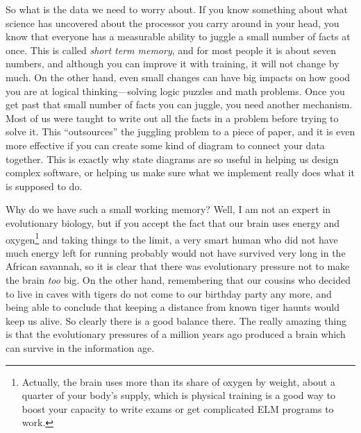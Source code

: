 \documentclass[12pt]{amsbook}
\begin{document}
{So what is the data we need to worry about.
If you know something about what science has uncovered about the processor you carry around in your head,
you  know that everyone has a measurable ability to juggle a small number of facts at once.
This is called \emph{short term memory},
and for most people it is about seven numbers, 
and although you can improve it with training,
it will not change by much.
On the other hand, even small changes can have big impacts on how 
good you are at logical thinking---solving logic puzzles and math problems.
Once you get past that small number of facts you can juggle,
you need another mechanism.
Most of us were taught to write out all the facts in a problem before trying to solve it.
This ``outsources'' the juggling problem to a piece of paper,
and it is even more effective if you can create some kind of diagram to connect your data together.
This is exactly why state diagrams are so useful 
in helping us design complex software, 
or helping us make sure what we implement really does what it is supposed to do.

Why do we have such a small working memory?
Well, I am not an expert in evolutionary biology,
but if you accept the fact that our brain uses 
energy and oxygen\footnote{Actually, the brain uses more than its share of oxygen by weight, about a quarter of your body's supply, which is physical training is a good way to boost your capacity to write exams or get complicated ELM programs to work.}
and taking things to the limit,
a very smart human who did not have much energy left for running
probably would not have survived very long in the African savannah,
so it is clear that there was evolutionary pressure not to make the brain \emph{too} big.
On the other hand,
remembering that our cousins who decided to live in caves with tigers do not come to our birthday party any more,
and being able to conclude that keeping a distance from known tiger haunts would keep us alive.
So clearly there is a good balance there.
The really amazing thing is that the evolutionary pressures of a million years ago produced a brain which can survive in the information age.

}
\end{document}
